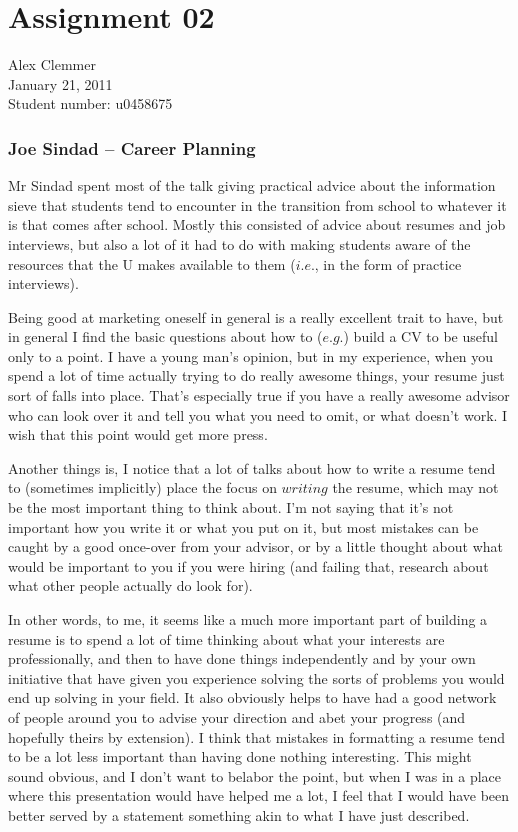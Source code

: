 \documentclass[a4paper]{article}
\begin{document}
\section*{Assignment 02}
Alex Clemmer\\
January 21, 2011\\
Student number: u0458675

\subsubsection*{Joe Sindad -- Career Planning}

Mr Sindad spent most of the talk giving practical advice about the information sieve that students tend to encounter in the transition from school to whatever it is that comes after school. Mostly this consisted of advice about resumes and job interviews, but also a lot of it had to do with making students aware of the resources that the U makes available to them ($\textit{i.e.}$, in the form of practice interviews).

Being good at marketing oneself in general is a really excellent trait to have, but in general I find the basic questions about how to ($\textit{e.g.}$) build a CV to be useful only to a point. I have a young man's opinion, but in my experience, when you spend a lot of time actually trying to do really awesome things, your resume just sort of falls into place. That's especially true if you have a really awesome advisor who can look over it and tell you what you need to omit, or what doesn't work. I wish that this point would get more press.

Another things is, I notice that a lot of talks about how to write a resume tend to (sometimes implicitly) place the focus on $\textit{writing}$ the resume, which may not be the most important thing to think about. I'm not saying that it's not important how you write it or what you put on it, but most mistakes can be caught by a good once-over from your advisor, or by a little thought about what would be important to you if you were hiring (and failing that, research about what other people actually do look for).

In other words, to me, it seems like a much more important part of building a resume is to spend a lot of time thinking about what your interests are professionally, and then to have done things independently and by your own initiative that have given you experience solving the sorts of problems you would end up solving in your field. It also obviously helps to have had a good network of people around you to advise your direction and abet your progress (and hopefully theirs by extension). I think that mistakes in formatting a resume tend to be a lot less important than having done nothing interesting. This might sound obvious, and I don't want to belabor the point, but when I was in a place where this presentation would have helped me a lot, I feel that I would have been better served by a statement something akin to what I have just described.
\end{document}
